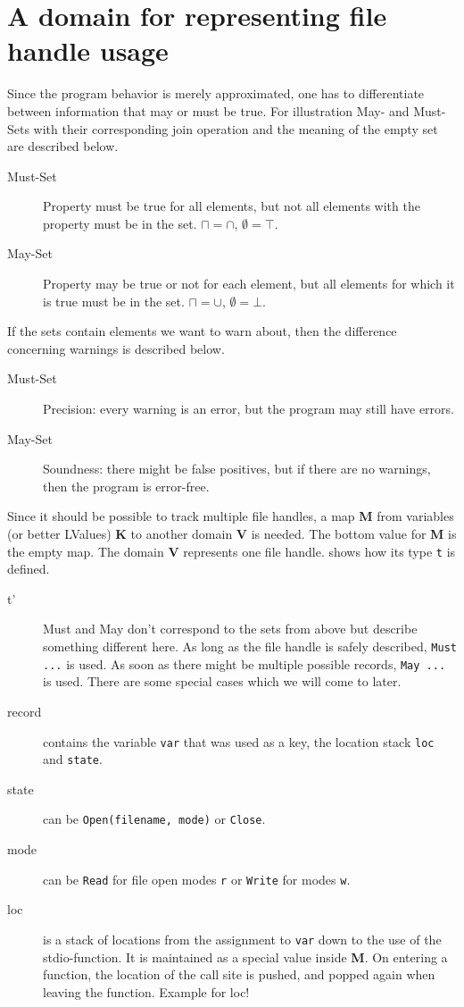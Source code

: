 \section{A domain for representing file handle usage}
Since the program behavior is merely approximated, one has to differentiate between information that may or must be true. For illustration May- and Must-Sets with their corresponding join operation and the meaning of the empty set are described below.
\begin{description}
\item[Must-Set] Property must be true for all elements, but not all elements with the property must be in the set. $\sqcap = \cap$, $\emptyset = \top$.
\item[May-Set] Property may be true or not for each element, but all elements for which  it is true must be in the set. $\sqcap = \cup$, $\emptyset = \bot$.
\end{description}
If the sets contain elements we want to warn about, then the difference concerning warnings is described below.
\begin{description}
\item[Must-Set] Precision: every warning is an error, but the program may still have errors.
\item[May-Set] Soundness: there might be false positives, but if there are no warnings, then the program is error-free.
\end{description}

Since it should be possible to track multiple file handles, a map \textbf{M} from variables (or better LValues) \textbf{K} to another domain \textbf{V} is needed. The bottom value for \textbf{M} is the empty map.
The domain \textbf{V} represents one file handle.  shows how its type \verb|t| is defined.
\begin{description}
\item[t'] Must and May don't correspond to the sets from above but describe something different here. As long as the file handle is safely described, \verb|Must ...| is used. As soon as there might be multiple possible records, \verb|May ...| is used. There are some special cases which we will come to later.

\item[record] contains the variable \verb|var| that was used as a key, the location stack \verb|loc| and \verb|state|.

\item[state] can be \verb|Open(filename, mode)| or \verb|Close|.

\item[mode] can be \verb|Read| for file open modes \verb|r| or \verb|Write| for modes \verb|w|.

\item[loc] is a stack of locations from the assignment to \verb|var| down to the use of the stdio-function. It is maintained as a special value inside \textbf{M}. On entering a function, the location of the call site is pushed, and popped again when leaving the function.
Example for loc!
\end{description}

